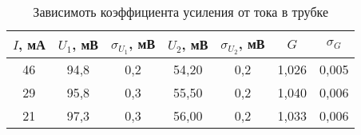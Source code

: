 \begin{table}[]
    \centering
    \begin{tabular}{|c|c|c|c|c|c|c|}
    \hline
    $I$, мА & $U_1$, мВ & $\sigma_{U_1}$, мВ & $U_2$, мВ & $\sigma_{U_2}$, мВ & $G$     & $\sigma_G$ \\ \hline
    46      & 94,8      & 0,2                & 54,20     & 0,2                & 1,026   & 0,005      \\ \hline
    29      & 95,8                           & 0,3       & 55,50  & 0,2       & 1,040   & 0,006      \\ \hline
    21      & 97,3                           & 0,3       & 56,00  & 0,2       & 1,033   & 0,006      \\ \hline
    \end{tabular}
    \caption{Зависимоть коэффициента усиления от тока в трубке}
    \label{table:intensity}
\end{table}